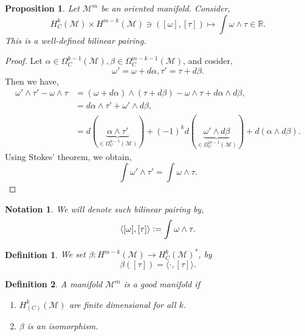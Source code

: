 \documentclass[8pt]{article}
\newtheorem{proposition}{Proposition}[section]
\newtheorem{definition}{Definition}[section]
\newtheorem{notation}{Notation}[section]
\newcommand{\defeq}{\vcentcolon=}
\newcommand{\R}[0]{\mathbb{R}}
\newcommand{\M}[0]{\mathcal{M}}
\begin{document}
\begin{proposition}
  Let $\M^m$ be an oriented manifold. Consider,
  \begin{equation*}
    H_C^k(\M)\times H^{m-k}(\M)\ni([\omega],[\tau])\mapsto\int\omega\wedge\tau\in\R.
  \end{equation*}
  This is a well-defined bilinear pairing.
\end{proposition}
\begin{proof}
  Let $\alpha\in\Omega_C^{k-1}(\M),\beta\in\Omega^{m-k-1}_C(\M)$, and cosider,
  \begin{equation*}
    \omega'=\omega+d\alpha,\tau'=\tau+d\beta.
  \end{equation*}
  Then we have,
  \begin{align*}
    \omega'\wedge\tau'-\omega\wedge\tau&= (\omega+d\alpha)\wedge(\tau+d\beta)-\omega\wedge\tau+d\alpha\wedge d\beta,\\
    & = d\alpha\wedge\tau'+\omega'\wedge d\beta,\\
    & = d(\underbrace{\alpha\wedge\tau'}_{\in\Omega_C^{n-1}(\M)})+(-1)^kd(\underbrace{\omega'\wedge d\beta}_{\in\Omega^{m-1}_C(\M)})+d(\alpha\wedge d\beta).
  \end{align*}
  Using Stokes' theorem, we obtain,
  \begin{equation*}
    \int\omega'\wedge\tau' = \int\omega\wedge\tau.
  \end{equation*}
\end{proof}

\begin{notation}
  We will denote such bilinear pairing by,
  \begin{equation*}
    \langle[\omega],[\tau]\rangle\defeq\int\omega\wedge\tau.
  \end{equation*}
\end{notation}

\begin{definition}
  We set $\beta:H^{m-k}(\M)\to H_C^k(\M)^*$, by
  \begin{equation*}
    \beta([\tau]) = \langle\cdot,[\tau]\rangle.
  \end{equation*}
\end{definition}

\begin{definition}
  A manifold $\M^m$ is a good manifold if 
  \begin{enumerate}
    \item $H_{(C)}^k(\M)$ are finite dimensional for all $k$.
    \item $\beta$ is an isomorphism.
  \end{enumerate}
\end{definition}
\end{document}
